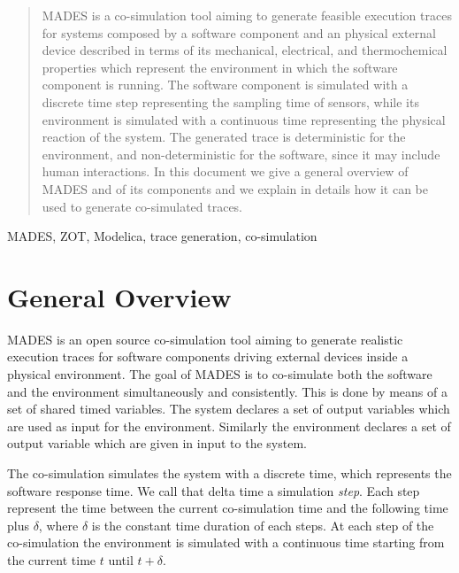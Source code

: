 \documentclass{kapproc} %
\begin{document}
\pagebreak 
\begin{abstract}
MADES is a co-simulation tool aiming to generate feasible execution traces
for systems composed by a software component and an physical external device described in terms of its mechanical, electrical, and thermochemical 
properties which represent the environment in which the software component is running. The software component is simulated with a discrete time step representing the sampling time of sensors,
while its environment is simulated with a continuous time
representing the physical reaction of the system. The generated trace is deterministic for the environment, and non-deterministic for the software,
since it may include human interactions. In this document we give a general overview of MADES and of its components and we explain in details how it can be used to generate co-simulated traces.
\end{abstract}

\begin{keywords}
MADES, ZOT, Modelica, trace generation, co-simulation
\end{keywords}


\pagebreak 
\section{General Overview}
\label{section:general-overview}

MADES is an open source co-simulation tool aiming to generate realistic execution traces for software components driving external devices inside a physical environment. The goal of MADES is to co-simulate both the software and the environment simultaneously and consistently.  This is done by means of a set of shared timed variables. The system declares a set of output
variables which are used as input for the environment. Similarly the environment declares a set of output variable which are given in input to the system. 

The co-simulation simulates the system with a discrete time, which 
represents the software response time. We call that delta time a 
simulation \emph{step}. Each step represent the time between the current 
co-simulation time and the following time plus $\delta$, where $\delta$ is 
the constant time duration of each steps. At each step
of the co-simulation the environment is simulated with a continuous 
time starting from the current time $t$ until $t +\delta$. 
\end{document}
